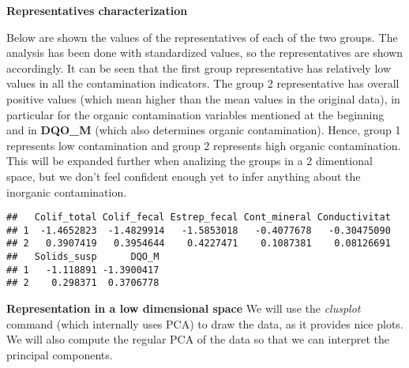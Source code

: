 \documentclass[]{article}
\newenvironment{Shaded}{\begin{snugshade}}{\end{snugshade}}
\newcommand{\KeywordTok}[1]{\textcolor[rgb]{0.13,0.29,0.53}{\textbf{#1}}}
\newcommand{\DataTypeTok}[1]{\textcolor[rgb]{0.13,0.29,0.53}{#1}}
\newcommand{\DecValTok}[1]{\textcolor[rgb]{0.00,0.00,0.81}{#1}}
\newcommand{\StringTok}[1]{\textcolor[rgb]{0.31,0.60,0.02}{#1}}
\newcommand{\OperatorTok}[1]{\textcolor[rgb]{0.81,0.36,0.00}{\textbf{#1}}}
\newcommand{\NormalTok}[1]{#1}
\begin{document}
\textbf{Representatives characterization}

Below are shown the values of the representatives of each of the two
groups. The analysis has been done with standardized values, so the
representatives are shown accordingly. It can be seen that the first
group representative has relatively low values in all the contamination
indicators. The group 2 representative has overall positive values
(which mean higher than the mean values in the original data), in
particular for the organic contamination variables mentioned at the
beginning and in \textbf{DQO\_M} (which also determines organic
contamination). Hence, group 1 represents low contamination and group 2
represents high organic contamination. This will be expanded further
when analizing the groups in a 2 dimentional space, but we don't feel
confident enough yet to infer anything about the inorganic
contamination.

\begin{Shaded}
\end{Shaded}

\begin{verbatim}
##   Colif_total Colif_fecal Estrep_fecal Cont_mineral Conductivitat
## 1  -1.4652823  -1.4829914   -1.5853018   -0.4077678   -0.30475090
## 2   0.3907419   0.3954644    0.4227471    0.1087381    0.08126691
##   Solids_susp      DQO_M
## 1   -1.118891 -1.3900417
## 2    0.298371  0.3706778
\end{verbatim}

\begin{Shaded}
\end{Shaded}

\textbf{Representation in a low dimensional space} We will use the
\emph{clusplot} command (which internally uses PCA) to draw the data, as
it provides nice plots. We will also compute the regular PCA of the data
so that we can interpret the principal components.
\end{document}
